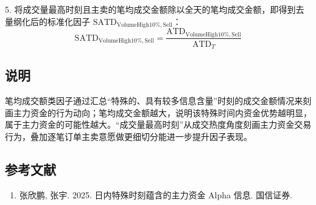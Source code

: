 \documentclass{article}
\begin{document}
5. 将成交量最高时刻且主卖的笔均成交金额除以全天的笔均成交金额，即得到去量纲化后的标准化因子 \( \mathrm{SATD}_{\mathrm{VolumeHigh10\%,Sell}} \)：
\begin{equation}
    \mathrm{SATD}_{\mathrm{VolumeHigh10\%,Sell}} = \frac{\mathrm{ATD}_{\mathrm{VolumeHigh10\%,Sell}}}{\mathrm{ATD}_T}
\end{equation}

\subsection{说明}
笔均成交额类因子通过汇总“特殊的、具有较多信息含量”时刻的成交金额情况来刻画主力资金的行为动向；笔均成交金额越大，说明该特殊时间内资金优势越明显，属于主力资金的可能性越大。“成交量最高时刻”从成交热度角度刻画主力资金交易行为，叠加逐笔订单主卖意愿做更细切分能进一步提升因子表现。

\subsection{参考文献}
\begin{enumerate}
    \item 张欣鹏, 张宇. 2025. 日内特殊时刻蕴含的主力资金 Alpha 信息. 国信证券.
\end{enumerate}
\end{document}

